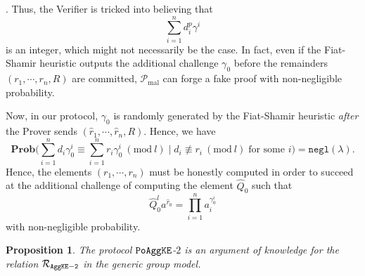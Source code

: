 \documentclass[11pt, lettersize, notitlepage, leqno, footskip=0.6cm]{article}
\newcommand{\pl}{\prod\limits}
\newcommand{\slim}{\sum\limits}
\newcommand{\ttt}{\texttt}
\newcommand{\negl}{\ttt{{negl}}}
\newcommand{\mc}{\mathcal}
\newcommand{\mbf}{\mathbf}
\newcommand{\mr}{\mathrm}
\newcommand{\lam}{\lambda}
\newcommand{\what}{\widehat}
\newcommand{\Prob}{\mbf{Prob}}
\newcommand{\mP}{\mc{P}}
\newcommand{\vs}{\vspace{-0.15cm}}
\newcommand{\noin}{\noindent}
\newcommand{\Mod}[1]{\ (\mathrm{mod}\ #1)}
\newtheorem{Prop}[Thm]{Proposition}
\numberwithin{equation}{section}
\begin{document}
\noin 3. Thus, the Verifier is tricked into believing that \vs $$\slim_{i=1}^n d_i^{p}\gamma^i$$ is an integer, which  might not necessarily be the case. In fact, even if the Fiat-Shamir heuristic outputs the additional challenge $\gamma_0$ before the remainders $(r_1,\cdots,r_n, R)$ are committed, $\mP_{\mr{mal}}$ can forge a fake proof with non-negligible probability. 

Now, in our protocol, $\gamma_0$ is randomly generated by the Fiat-Shamir heuristic \textit{after} the Prover sends $(\what{r}_1,\cdots,\what{r}_n, R)$. Hence, we have \vs $$\Prob\Big(\slim_{i=1}^n d_i\gamma_0^i \equiv \slim_{i=1}^n r_i\gamma_0^i \Mod{l}\;\Big|\; d_i\not\equiv r_i\Mod{l}\;\text{for some } i\Big) = \negl(\lam). $$ Hence, the elements $(r_1,\cdots,r_n)$ must be honestly computed in order to succeed at the additional challenge of computing the element $\what{Q}_0$ such that \vs $$\what{Q}_0^la^{\what{r}_0}= \pl_{i=1}^{n} a_i^{\gamma_0^i} $$ with non-negligible probability.

\noin 


\vspace{0.2cm}

\begin{Prop} The protocol $\tt{PoAggKE}$-$2$ is an argument of knowledge for the relation $\mc{R}_{{\tt{AggKE-2}}}$ in the generic group model.\end{Prop}
\end{document}
